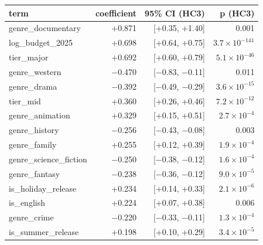 \begin{tabular}{lrrr}
\toprule
term & coefficient & 95\% CI (HC3) & p (HC3) \\
\midrule
genre\_documentary & +0.871 & [+0.35, +1.40] & 0.001 \\
log\_budget\_2025 & +0.698 & [+0.64, +0.75] & $3.7\times10^{-141}$ \\
tier\_major & +0.692 & [+0.60, +0.79] & $5.1\times10^{-46}$ \\
genre\_western & $-$0.470 & [$-$0.83, $-$0.11] & 0.011 \\
genre\_drama & $-$0.392 & [$-$0.49, $-$0.29] & $3.6\times10^{-15}$ \\
tier\_mid & +0.360 & [+0.26, +0.46] & $7.2\times10^{-12}$ \\
genre\_animation & +0.329 & [+0.15, +0.51] & $2.7\times10^{-4}$ \\
genre\_history & $-$0.256 & [$-$0.43, $-$0.08] & 0.003 \\
genre\_family & +0.255 & [+0.12, +0.39] & $1.9\times10^{-4}$ \\
genre\_science\_fiction & $-$0.250 & [$-$0.38, $-$0.12] & $1.6\times10^{-4}$ \\
genre\_fantasy & $-$0.238 & [$-$0.36, $-$0.12] & $9.0\times10^{-5}$ \\
is\_holiday\_release & +0.234 & [+0.14, +0.33] & $2.1\times10^{-6}$ \\
is\_english & +0.224 & [+0.07, +0.38] & 0.006 \\
genre\_crime & $-$0.220 & [$-$0.33, $-$0.11] & $1.3\times10^{-4}$ \\
is\_summer\_release & +0.198 & [+0.10, +0.29] & $3.4\times10^{-5}$ \\
\bottomrule
\end{tabular}
